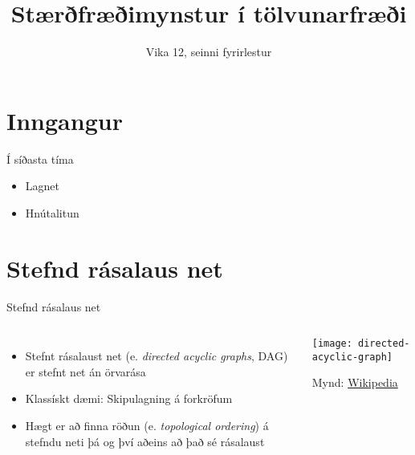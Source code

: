 \documentclass[handout]{beamer}
\title{Stærðfræðimynstur í tölvunarfræði}
\subtitle{Vika 12, seinni fyrirlestur}
\begin{document}
\begin{frame}
\titlepage
\end{frame}


\section{Inngangur}

\begin{frame}{Í síðasta tíma}
    \begin{itemize}
        \item Lagnet
        \item Hnútalitun
    \end{itemize}
\end{frame}

\section{Stefnd rásalaus net}

\begin{frame}{Stefnd rásalaus net}
    \begin{columns}
        \begin{itemize}
            \item Stefnt rásalaust net (e. \emph{directed acyclic graphs}, DAG) er stefnt net án örvarása
            \item Klassískt dæmi: Skipulagning á forkröfum
            \item Hægt er að finna röðun (e. \emph{topological ordering}) á stefndu neti þá og því aðeins að það sé rásalaust
        \end{itemize}
        \begin{center}
            \texttt{[image: directed-acyclic-graph]}
            
            Mynd: \href{https://commons.wikimedia.org/wiki/File:Directed_acyclic_graph.svg}{Wikipedia}
        \end{center}
    \end{columns}
\end{frame}
\end{document}
